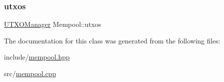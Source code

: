 \subsubsection{\texorpdfstring{utxos}{utxos}}
{\footnotesize\ttfamily \mbox{\hyperlink{classUTXOManager}{U\+T\+X\+O\+Manager}} Mempool\+::utxos\hspace{0.3cm}{\ttfamily [private]}}



The documentation for this class was generated from the following files\+:\begin{DoxyCompactItemize}
\item 
include/\mbox{\hyperlink{mempool_8hpp}{mempool.\+hpp}}\item 
src/\mbox{\hyperlink{mempool_8cpp}{mempool.\+cpp}}\end{DoxyCompactItemize}
